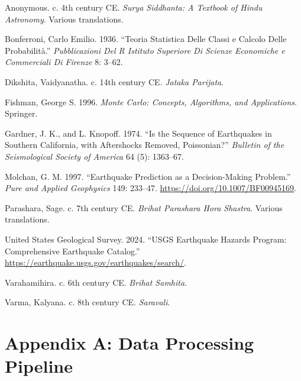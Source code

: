 \documentclass[
  11pt,
  a4paper,
  oneside,
  openany]{article}
\newlength{\cslhangindent}
\newenvironment{CSLReferences}[2] %
 {\begin{list}{}{%
  \setlength{\itemindent}{0pt}
  \setlength{\leftmargin}{0pt}
  \setlength{\parsep}{0pt}
  \ifodd #1
   \setlength{\leftmargin}{\cslhangindent}
   \setlength{\itemindent}{-1\cslhangindent}
  \fi
  \setlength{\itemsep}{#2\baselineskip}}}
 {\end{list}}
\begin{document}
\label{refs}
\begin{CSLReferences}{1}{0}
Anonymous. c. 4th century CE. \emph{Surya Siddhanta: A Textbook of Hindu
Astronomy}. Various translations.

Bonferroni, Carlo Emilio. 1936. {``Teoria Statistica Delle Classi e
Calcolo Delle Probabilità.''} \emph{Pubblicazioni Del R Istituto
Superiore Di Scienze Economiche e Commerciali Di Firenze} 8: 3--62.

Dikshita, Vaidyanatha. c. 14th century CE. \emph{Jataka Parijata}.

Fishman, George S. 1996. \emph{Monte Carlo: Concepts, Algorithms, and
Applications}. Springer.

Gardner, J. K., and L. Knopoff. 1974. {``Is the Sequence of Earthquakes
in Southern California, with Aftershocks Removed, Poissonian?''}
\emph{Bulletin of the Seismological Society of America} 64 (5):
1363--67.

Molchan, G. M. 1997. {``Earthquake Prediction as a Decision-Making
Problem.''} \emph{Pure and Applied Geophysics} 149: 233--47.
\url{https://doi.org/10.1007/BF00945169}.

Parashara, Sage. c. 7th century CE. \emph{Brihat Parashara Hora
Shastra}. Various translations.

United States Geological Survey. 2024. {``USGS Earthquake Hazards
Program: Comprehensive Earthquake Catalog.''}
\url{https://earthquake.usgs.gov/earthquakes/search/}.

Varahamihira. c. 6th century CE. \emph{Brihat Samhita}.

Varma, Kalyana. c. 8th century CE. \emph{Saravali}.

\end{CSLReferences}

\section{Appendix A: Data Processing
Pipeline}\label{appendix-a-data-processing-pipeline}
\end{document}
